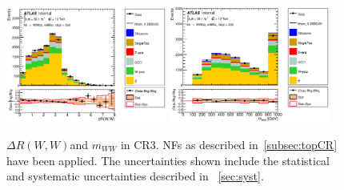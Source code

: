 \begin{figure}[!h]
\begin{center}
\includegraphics*[width=0.47\textwidth] {figures/ControlPlots/reOpt2000/C_mBBcr_reOpt2000_bbpt350_drww_regionA_met25d020}
\includegraphics*[width=0.47\textwidth] {figures/ControlPlots/reOpt2000/C_mBBcr_reOpt2000_bbpt350_WWMass_regionA_met25d020.eps}
\caption[$\Delta R(W,W)$and  $m_{WW}$ in CR3.]{$\Delta R(W,W)$and  $m_{WW}$ in CR3.  \ttbar NFs as described in~\ref{subsec:topCR} have been applied. The uncertainties shown include the statistical and systematic uncertainties described in ~\ref{sec:syst}.}
\end{center}
\end{figure}

